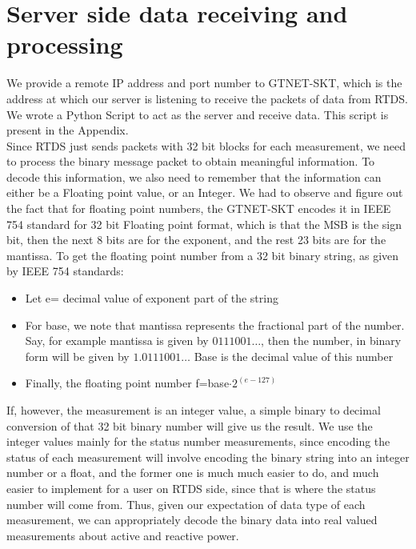 \section{Server side data receiving and processing}
We provide a remote IP address and port number to GTNET-SKT, which is the address at which our server is listening to receive the packets of data from RTDS. We wrote a Python Script to act as the server and receive data. This script is present in the Appendix.\\
Since RTDS just sends packets with 32 bit blocks for each measurement, we need to process the binary message packet to obtain meaningful information. To decode this information, we also need to remember that the information can either be a Floating point value, or an Integer. We had to observe and figure out the fact that for floating point numbers, the GTNET-SKT encodes it in IEEE 754 standard for 32 bit Floating point format, which is that the MSB is the sign bit, then the next 8 bits are for the exponent, and the rest 23 bits are for the mantissa. To get the floating point number from a 32 bit binary string, as given by IEEE 754 standards:
\begin{itemize}
\item Let e= decimal value of exponent part of the string
\item For base, we note that mantissa represents the fractional part of the number. Say, for example mantissa is given by $0111001\dots$, then the number, in binary form will be given by $1.0111001\dots$ Base is the decimal value of this number
\item Finally, the floating point number f=base$\cdot2^{(e-127)}$
\end{itemize}
If, however, the measurement is an integer value, a simple binary to decimal conversion of that 32 bit binary number will give us the result. We use the integer values mainly for the status number measurements, since encoding the status of each measurement will involve encoding the binary string into an integer number or a float, and the former one is much much easier to do, and much easier to implement for a user on RTDS side, since that is where the status number will come from.
Thus, given our expectation of data type of each measurement, we can appropriately decode the binary data into real valued measurements about active and reactive power.
